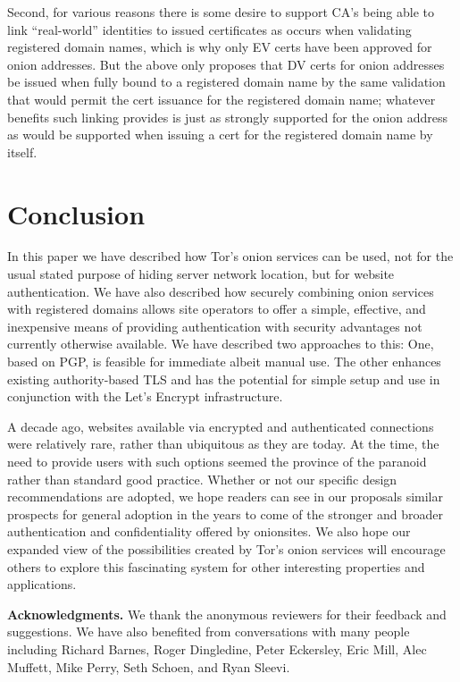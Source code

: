 \documentclass[10pt]{styles/IEEEtran}
\newcommand{\point}[1]{\vspace{2mm} \noindent\textbf{#1}}
\begin{document}
Second, for various reasons there is some desire to support CA's being
able to link ``real-world'' identities to issued certificates as
occurs when validating registered domain names, which is why only EV
certs have been approved for onion addresses. But the above only
proposes that DV certs for onion addresses be issued when fully bound
to a registered domain name by the same validation that would permit
the cert issuance for the registered domain name; whatever benefits
such linking provides is just as strongly supported for the onion
address as would be supported when issuing a cert for the registered
domain name by itself.

\section{Conclusion}

In this paper we have described how Tor's onion services can be used,
not for the usual stated purpose of hiding server network location,
but for website authentication.  We have also described how securely
combining onion services with registered domains allows site operators
to offer a simple, effective, and inexpensive means of providing
authentication with security advantages not currently otherwise
available. We have described two approaches to this: One, based on
PGP, is feasible for immediate albeit manual use.
The other enhances existing authority-based TLS and has the potential
for simple setup and use in conjunction with the Let's Encrypt
infrastructure.

A decade ago, websites available via encrypted and authenticated
connections were relatively rare, rather than ubiquitous as they are
today.  At the time, the need to provide users with such options
seemed the province of the paranoid rather than standard good
practice. Whether or not our specific design recommendations are
adopted, we hope readers can see in our proposals similar prospects
for general adoption in the years to come of the stronger and broader
authentication and confidentiality offered by onionsites. We also hope
our expanded view of the possibilities created by Tor's onion services
will encourage others to explore this fascinating system for other
interesting properties and applications.


\point{Acknowledgments.}
We thank the anonymous reviewers for their feedback and suggestions.
We have also benefited from conversations with many people including
Richard Barnes, Roger Dingledine, Peter Eckersley, Eric Mill, Alec
Muffett, Mike Perry, Seth Schoen, and Ryan Sleevi.
\end{document}
